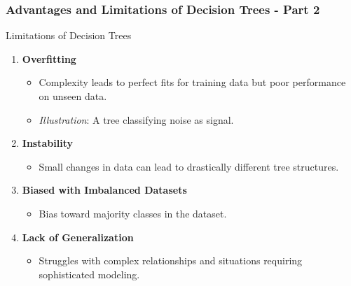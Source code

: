 \documentclass[aspectratio=169]{beamer}
\begin{document}
\begin{frame}[fragile]
    \frametitle{Advantages and Limitations of Decision Trees - Part 2}

    \begin{block}{Limitations of Decision Trees}
        \begin{enumerate}
            \item \textbf{Overfitting}
            \begin{itemize}
                \item Complexity leads to perfect fits for training data but poor performance on unseen data.
                \item \textit{Illustration}: A tree classifying noise as signal.
            \end{itemize}

            \item \textbf{Instability}
            \begin{itemize}
                \item Small changes in data can lead to drastically different tree structures.
            \end{itemize}

            \item \textbf{Biased with Imbalanced Datasets}
            \begin{itemize}
                \item Bias toward majority classes in the dataset.
            \end{itemize}

            \item \textbf{Lack of Generalization}
            \begin{itemize}
                \item Struggles with complex relationships and situations requiring sophisticated modeling.
            \end{itemize}
        \end{enumerate}
    \end{block}
\end{frame}
\end{document}
